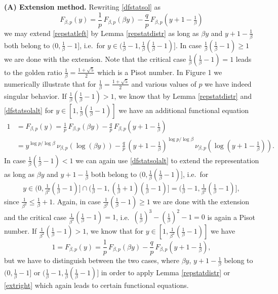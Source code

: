 \documentclass[12pt]{amsart}
\theoremstyle{definition}
\theoremstyle{remark}
\numberwithin{equation}{section}
\begin{document}
{\bf (A) Extension method.}
Rewriting \eqref{dfstatsol} as 
\begin{equation}\label{dfstatsolalt}
F_{\beta,p}(y) =\frac1{p}\,F_{\beta,p}(\beta y)-\frac{q}{p}\,F_{\beta,p}(y+1-\tfrac1{\beta})
\end{equation}
we may extend \eqref{repstatleft} by Lemma \ref{repstatdistr} as long as $\beta y$ and $y+1-\tfrac1{\beta}$ both belong to $(0,\frac1{\beta}-1]$, i.e.\ for $y\in(\frac1{\beta}-1,\frac1{\beta}(\frac1{\beta}-1)]$. In case $\frac1{\beta}(\frac1{\beta}-1)\geq 1$ we are done with the extension. Note that the critical case $\frac1{\beta}(\frac1{\beta}-1)=1$ leads to the golden ratio $\frac1{\beta}=\frac{1+\sqrt{5}}{2}$ which is a Pisot number. In Figure 1 we numerically illustrate that for $\frac1{\beta}=\frac{1+\sqrt{5}}{2}$ and various values of $p$ we have indeed singular behavior. If $\frac1{\beta}(\frac1{\beta}-1)>1$, we know that by Lemma \ref{repstatdistr} and \eqref{dfstatsolalt} for $y\in[1,\frac1{\beta}(\frac1{\beta}-1)]$ we have an additional functional equation
\begin{equation}\label{extright}\begin{split}
1 & = F_{\beta,p}(y) =\frac1{p}\,F_{\beta,p}(\beta y)-\frac{q}{p}\,F_{\beta,p}(y+1-\tfrac1{\beta})\\
& = y^{\log p/\log\beta}\,\nu_{\beta,p}(\log(\beta y))-\frac{q}{p}\,(y+1-\tfrac1{\beta})^{\log p/\log\beta}\,\nu_{\beta,p}(\log(y+1-\tfrac1{\beta})).
\end{split}\end{equation}
In case $\frac1{\beta}(\frac1{\beta}-1)<1$ we can again use \eqref{dfstatsolalt} to extend the representation as long as $\beta y$ and $y+1-\tfrac1{\beta}$ both belong to $(0,\frac1{\beta}(\frac1{\beta}-1)]$, i.e.\ for
$$y\in(0,\tfrac1{\beta^2}(\tfrac1{\beta}-1)]\cap(\tfrac1{\beta}-1,(\tfrac1{\beta}+1)(\tfrac1{\beta}-1) ]=(\tfrac1{\beta}-1,\tfrac1{\beta^2}(\tfrac1{\beta}-1)],$$
since $\frac1{\beta^2}\leq\frac1{\beta}+1$. Again, in case $\frac1{\beta^2}(\frac1{\beta}-1)\geq 1$ we are done with the extension and the critical case $\frac1{\beta^2}(\frac1{\beta}-1)=1$, i.e.\ $(\frac1{\beta})^3-(\frac1{\beta})^2-1=0$ is again a Pisot number. If $\frac1{\beta^2}(\frac1{\beta}-1)>1$, we know that for $y\in[1,\frac1{\beta^2}(\frac1{\beta}-1)]$ we have
\begin{equation}\label{step2}
1 = F_{\beta,p}(y) =\frac1{p}\,F_{\beta,p}(\beta y)-\frac{q}{p}\,F_{\beta,p}(y+1-\tfrac1{\beta}),
\end{equation}
but we have to distinguish between the two cases, where $\beta y$, $y+1-\tfrac1{\beta}$ belong to $(0,\frac1{\beta}-1]$ or $(\frac1{\beta}-1,\frac1{\beta}(\frac1{\beta}-1)]$ in order to apply Lemma \ref{repstatdistr} or \eqref{extright} which again leads to certain functional equations. \\
\end{document}
